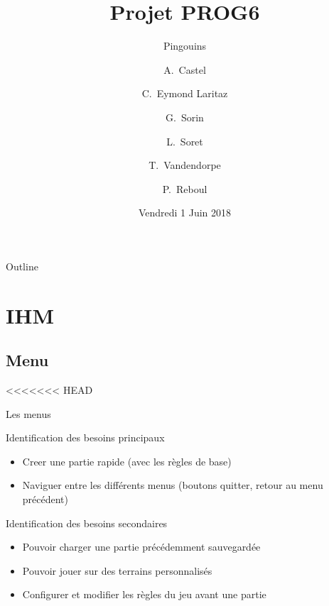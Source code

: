 \documentclass{beamer}
\title{Projet PROG6}
\subtitle{Pingouins}
\author{A.~Castel \and C.~Eymond Laritaz \and G.~Sorin \and L.~Soret \and T.~Vandendorpe \and P.~Reboul}
\institute[Université Grenoble-Alpes] %
{
  UFR IM²AG\\
  Université Grenoble-Alpes
}
\date{Vendredi 1 Juin 2018}
\begin{document}
\begin{frame}
  \titlepage
\end{frame}

\begin{frame}{Outline}
  \tableofcontents
\end{frame}

\section{IHM}

\subsection{Menu}

<<<<<<< HEAD
\begin{frame}{Les menus}
  \begin{block}{Identification des besoins principaux}
	\begin{itemize}
	\item <1-> Creer une partie rapide (avec les règles de base)
	\item <2-> Naviguer entre les différents menus (boutons quitter, retour au menu précédent)
  	\end{itemize}
  \end{block}
\end{frame}

\begin{frame}{}
  \begin{block}{Identification des besoins secondaires}
	\begin{itemize}
	\item <1-> Pouvoir charger une partie précédemment sauvegardée
	\item <2-> Pouvoir jouer sur des terrains personnalisés
	\item <3-> Configurer et modifier les règles du jeu avant une partie
  	\end{itemize}
  \end{block}
\end{frame}
\end{document}
